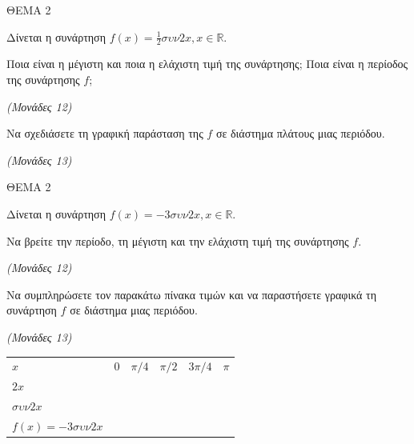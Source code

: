 \documentclass[11pt,a4paper,twoside]{book}
\newcommand{\monades}[1]{\hfill \textit{(Μονάδες #1)}}
\begin{document}
\vspace{4mm}

ΘΕΜΑ 2

Δίνεται η συνάρτηση $f(x) = \frac{1}{2}\sigma\upsilon\nu 2x, x \in \mathbb{R}$.

\begin{alist}
\item Ποια είναι η μέγιστη και ποια η ελάχιστη τιμή της συνάρτησης; Ποια είναι η περίοδος της συνάρτησης $f$;

\monades{12}

\item Να σχεδιάσετε τη γραφική παράσταση της $f$ σε διάστημα πλάτους μιας περιόδου.

\monades{13}
\end{alist}

\vspace{4mm}

ΘΕΜΑ 2

Δίνεται η συνάρτηση $f(x) = -3\sigma\upsilon\nu 2x, x \in \mathbb{R}$.

\begin{alist}
\item Να βρείτε την περίοδο, τη μέγιστη και την ελάχιστη τιμή της συνάρτησης $f$.

\monades{12}

\item Να συμπληρώσετε τον παρακάτω πίνακα τιμών και να παραστήσετε γραφικά τη συνάρτηση $f$ σε διάστημα μιας περιόδου.

\monades{13}

\begin{longtable}[]{@{}
  >{\centering\arraybackslash}p{}
  >{\raggedright\arraybackslash}p{}
  >{\raggedright\arraybackslash}p{}
  >{\raggedright\arraybackslash}p{}
  >{\raggedright\arraybackslash}p{}
  >{\raggedright\arraybackslash}p{}@{}}
\noalign{}
$x$ & $0$ & $\pi/4$ & $\pi/2$ & $3\pi/4$ & $\pi$ \\
\noalign{}

\noalign{}
\endlastfoot
$2x$ & & & & & \\
$\sigma\upsilon\nu 2x$ & & & & & \\
$f(x) = -3\sigma\upsilon\nu 2x$ & & & & & \\
\end{longtable}
\end{alist}
\end{document}
